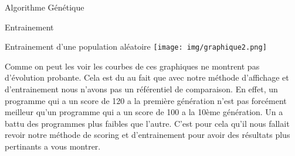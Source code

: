 \documentclass[a4paper, 10pt]{article}
\begin{document}
\begin{section}{Algorithme Génétique}
\begin{subsection}{Entrainement}
\begin{subsubsection}{Entrainement d'une population aléatoire}
                        \texttt{[image: img/graphique2.png]}
                        \bigskip
                    \par
                        Comme on peut les voir les courbes de ces graphiques ne montrent pas d'évolution probante. Cela est du au fait que avec notre méthode d'affichage et d'entrainement nous n'avons pas un référentiel de comparaison. En effet, un programme qui a un score de 120 a la première génération n'est pas forcément meilleur qu'un programme qui a un score de 100 a la 10ème génération. Un a battu des programmes plus faibles que l'autre. C'est pour cela qu'il nous fallait revoir notre méthode de scoring et d'entrainement pour avoir des résultats plus pertinants a vous montrer.
                \end{subsubsection}    


\end{subsection}
\end{section}
\end{document}
